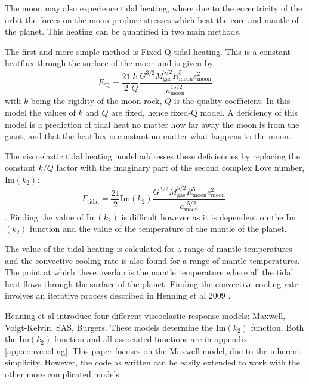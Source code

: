 \documentclass[12pt, onecolumn]{revtex4-2}    %
\begin{document}
The moon may also experience tidal heating, where due to the eccentricity of the orbit the forces on the moon produce stresses which heat the core and mantle of the planet.
This heating can be quantified in two main methods.

The first and more simple method is Fixed-Q tidal heating.
This is a constant heatflux through the surface of the moon and is given by,
\begin{equation}
    F_{\text{fQ}} = \frac{21}{2} \frac{k}{Q} \frac{G^{3/2}M_{\text{gas}}^{5/2}R_{\text{moon}}^5 e_{\text{moon}}^2} {a_{\text{moon}}^{15/2}}
\end{equation}
with $k$ being the rigidity of the moon rock, $Q$ is the quality coefficient.
In this model the values of $k$ and $Q$ are fixed, hence fixed-Q model.
A deficiency of this model is a prediction of tidal heat no matter how far away the moon is from the giant, and that the heatflux is constant no matter what happens to the moon.

The viscoelastic tidal heating model addresses these deficiencies by replacing the constant $k/Q$ factor with the imaginary part of the second complex Love number, $\text{Im}(k_2)$:
\begin{equation}
    F_{\text{tidal}} = \frac{21}{2} \text{Im}(k_2) \frac{G^{3/2}M_{\text{gas}}^{5/2}R_{\text{moon}}^5 e_{\text{moon}}^2} {a_{\text{moon}}^{15/2}}.
\end{equation} \cite{YP1981} \cite{Segatz1988} \cite{DHT2015}.
Finding the value of $\text{Im}(k_2)$ is difficult however as it is dependent on the Im$(k_2)$ function and the value of the temperature of the mantle of the planet.

The value of the tidal heating is calculated for a range of mantle temperatures and the convective cooling rate is also found for a range of mantle temperatures.
The point at which these overlap is the mantle temperature where all the tidal heat flows through the surface of the planet.
Finding the convective cooling rate involves an iterative process described in Henning et al 2009 \cite{Henning2009}.

Henning et al introduce four different viscoelastic response models: Maxwell, Voigt-Kelvin, SAS, Burgers.
These models determine the Im$(k_2)$ function.
Both the Im$(k_2)$ function and all associated functions are in appendix \ref{app:convcooling}.
This paper focuses on the Maxwell model, due to the inherent simplicity.
However, the code as written can be easily extended to work with the other more complicated models.
\end{document}
